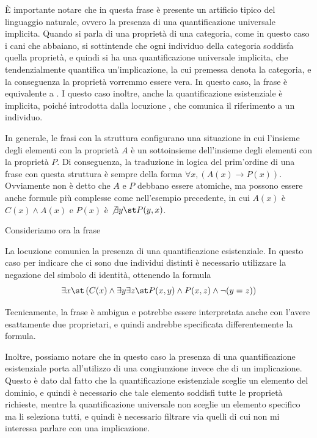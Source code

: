 È importante notare che in questa frase è presente un artificio tipico del linguaggio naturale, ovvero la presenza di una quantificazione universale implicita. Quando si parla di una proprietà di una categoria, come in questo caso i cani che abbaiano, si sottintende che ogni individuo della categoria soddisfa quella proprietà, e quindi si ha una quantificazione universale implicita, che tendenzialmente quantifica un'implicazione, la cui premessa denota la categoria, e la conseguenza la proprietà vorremmo essere vera. In questo caso, la frase  è equivalente a . I questo caso inoltre, anche la quantificazione esistenziale è implicita, poiché introdotta dalla locuzione , che comunica il riferimento a un individuo.

In generale, le frasi con la struttura  configurano una situazione in cui l'insieme degli elementi con la proprietà \(A\) è un sottoinsieme dell'insieme degli elementi con la proprietà \(P\). Di conseguenza, la traduzione in logica del prim'ordine di una frase con questa struttura è sempre della forma \(\forall x, (A(x) \to P(x))\).
Ovviamente non è detto che \(A\) e \(P\) debbano essere atomiche, ma possono essere anche formule più complesse come nell'esempio precedente, in cui \(A(x)\) è \(C(x)\land A(x)\) e \(P(x)\) è \(\not\exists y\st P(y,x)\).

Consideriamo ora la frase 
\begin{quote}
\end{quote}

La locuzione  comunica la presenza di una quantificazione esistenziale. In questo caso per indicare che ci sono due individui distinti è necessario utilizzare la negazione del simbolo di identità, ottenendo la formula
\[\exists x\st\left( C(x) \land \exists y \exists z\st P(x,y) \land P(x,z) \land \neg(y = z)\right)\]

Tecnicamente, la frase è ambigua e potrebbe essere interpretata anche con l'avere esattamente due proprietari, e quindi andrebbe specificata differentemente la formula.

Inoltre, possiamo notare che in questo caso la presenza di una quantificazione esistenziale porta all'utilizzo di una congiunzione invece che di un implicazione. Questo è dato dal fatto che la quantificazione esistenziale sceglie un elemento del dominio, e quindi è necessario che tale elemento soddisfi tutte le proprietà richieste, mentre la quantificazione universale non sceglie un elemento specifico ma li seleziona tutti, e quindi è necessario filtrare via quelli di cui non mi interessa parlare con una implicazione.

